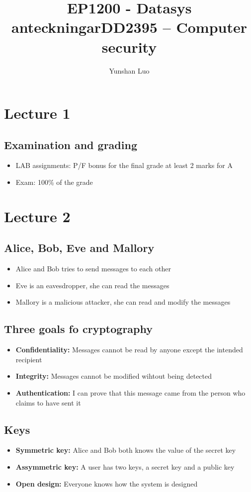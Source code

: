 \documentclass[12pt,a4paper]{article}
\title{EP1200 - Datasys anteckningar}
\author{Yunshan Luo}
\begin{document}
\title{DD2395 -- Computer security}
\maketitle
\newpage
\section{Lecture 1}
\subsection{Examination and grading}
\begin{itemize}
    \item LAB assignments: P/F bonus for the final grade at least 2 marks for A
    \item Exam: 100\% of the grade
\end{itemize}

\section{Lecture 2}
\subsection{Alice, Bob, Eve and Mallory}
\begin{itemize}
    \item Alice and Bob tries to send messages to each other
    \item Eve is an eavesdropper, she can read the messages
    \item Mallory is a malicious attacker, she can read and modify the messages
\end{itemize}

\subsection{Three goals fo cryptography}
\begin{itemize}
    \item \textbf{Confidentiality:} Messages cannot be read by anyone except the intended recipient
    \item \textbf{Integrity:} Messages cannot be modified wihtout being detected
    \item \textbf{Authentication:} I can prove that this message came from the person who claims to have sent it
\end{itemize}

\subsection{Keys}
\begin{itemize}
    \item \textbf{Symmetric key:} Alice and Bob both knows the value of the secret key
    \item \textbf{Assymmetric key:} A user has two keys, a secret key and a public key
    \item \textbf{Open design:} Everyone knows how the system is designed
\end{itemize}
\end{document}
